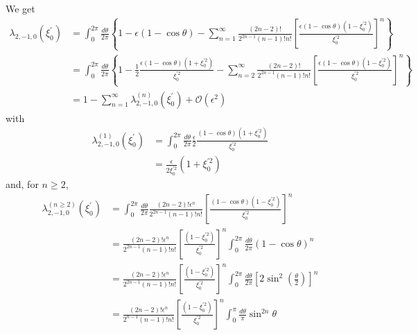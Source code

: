 We get%
\begin{align}
\lambda_{2,-1,0}\left(  \xi_{0}^{\prime}\right)   &  =\int_{0}^{2\pi}%
\frac{d\theta}{2\pi}\left\{  1-\epsilon\left(  1-\cos\theta\right)
-\sum_{n=1}^{\infty}\frac{\left(  2n-2\right)  !}{2^{2n-1}\left(  n-1\right)
!n!}\left[  \frac{\epsilon\left(  1-\cos\theta\right)  \left(  1-\xi
_{0}^{\prime2}\right)  }{\xi_{0}^{\prime2}}\right]  ^{n}\right\} \\
&  =\int_{0}^{2\pi}\frac{d\theta}{2\pi}\left\{  1-\frac{1}{2}\frac
{\epsilon\left(  1-\cos\theta\right)  \left(  1+\xi_{0}^{\prime2}\right)
}{\xi_{0}^{\prime2}}-\sum_{n=2}^{\infty}\frac{\left(  2n-2\right)  !}%
{2^{2n-1}\left(  n-1\right)  !n!}\left[  \frac{\epsilon\left(  1-\cos
\theta\right)  \left(  1-\xi_{0}^{\prime2}\right)  }{\xi_{0}^{\prime2}%
}\right]  ^{n}\right\} \\
&  =1-\sum_{n=1}^{\infty}\lambda_{2,-1,0}^{(n)}\left(  \xi_{0}^{\prime
}\right)  +\mathcal{O}\left(  \epsilon^{2}\right)
\end{align}
with%
\begin{align}
\lambda_{2,-1,0}^{(1)}\left(  \xi_{0}^{\prime}\right)   &  =\int_{0}^{2\pi
}\frac{d\theta}{2\pi}\frac{\epsilon}{2}\frac{\left(  1-\cos\theta\right)
\left(  1+\xi_{0}^{\prime2}\right)  }{\xi_{0}^{\prime2}}\\
&  =\frac{\epsilon}{2\xi_{0}^{\prime2}}\left(  1+\xi_{0}^{\prime2}\right)
\end{align}
and, for $n\geq2$,%
\begin{align}
\lambda_{2,-1,0}^{(n\geq2)}\left(  \xi_{0}^{\prime}\right)   &  =\int
_{0}^{2\pi}\frac{d\theta}{2\pi}\frac{\left(  2n-2\right)  !\epsilon^{n}%
}{2^{2n-1}\left(  n-1\right)  !n!}\left[  \frac{\left(  1-\cos\theta\right)
\left(  1-\xi_{0}^{\prime2}\right)  }{\xi_{0}^{\prime2}}\right]  ^{n}\\
&  =\frac{\left(  2n-2\right)  !\epsilon^{n}}{2^{2n-1}\left(  n-1\right)
!n!}\left[  \frac{\left(  1-\xi_{0}^{\prime2}\right)  }{\xi_{0}^{\prime2}%
}\right]  ^{n}\int_{0}^{2\pi}\frac{d\theta}{2\pi}\left(  1-\cos\theta\right)
^{n}\\
&  =\frac{\left(  2n-2\right)  !\epsilon^{n}}{2^{2n-1}\left(  n-1\right)
!n!}\left[  \frac{\left(  1-\xi_{0}^{\prime2}\right)  }{\xi_{0}^{\prime2}%
}\right]  ^{n}\int_{0}^{2\pi}\frac{d\theta}{2\pi}\left[  2\sin^{2}\left(
\frac{\theta}{2}\right)  \right]  ^{n}\\
&  =\frac{\left(  2n-2\right)  !\epsilon^{n}}{2^{n-1}\left(  n-1\right)
!n!}\left[  \frac{\left(  1-\xi_{0}^{\prime2}\right)  }{\xi_{0}^{\prime2}%
}\right]  ^{n}\int_{0}^{\pi}\frac{d\theta}{\pi}\sin^{2n}\theta
\end{align}


